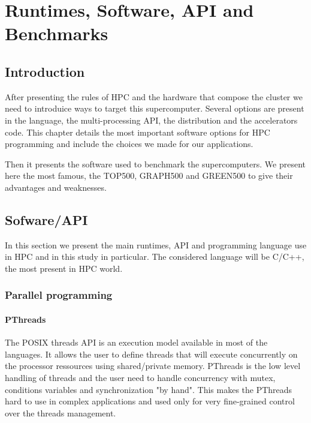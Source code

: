 
\chapter{Runtimes, Software, API and Benchmarks}

\section{Introduction}
After presenting the rules of HPC and the hardware that compose the cluster we need to introduice ways to target this supercomputer. 
Several options are present in the language, the multi-processing API, the distribution and the accelerators code. 
This chapter details the most important software options for HPC programming and include the choices we made for our applications.

Then it presents the software used to benchmark the supercomputers. 
We present here the most famous, the TOP500, GRAPH500 and GREEN500 to give their advantages and weaknesses. 


\section{Sofware/API}
In this section we present the main runtimes, API and programming language use in HPC and in this study in particular. 
The considered language will be C/C++, the most present in HPC world.

\subsection{Parallel programming}

\subsubsection{PThreads}
The POSIX threads API is an execution model available in most of the languages. 
It allows the user to define threads that will execute concurrently on the processor ressources using shared/private memory.
PThreads is the low level handling of threads and the user need to handle concurrency with mutex, conditions variables and synchronization "by hand".
This makes the PThreads hard to use in complex applications and used only for very fine-grained control over the threads management. 

